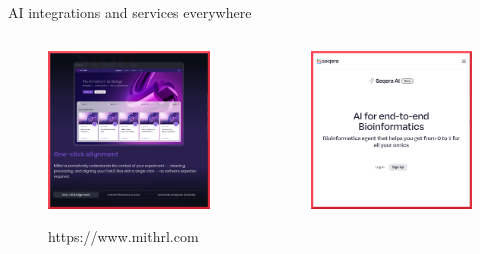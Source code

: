 \documentclass[10pt]{beamer}
\newcommand{\creditdark}[1]{{\par \raggedleft \scriptsize \mdseries \color{scMGray} #1 \par}}
\begin{document}
\begin{frame}{AI integrations and services everywhere}
\begin{columns}[T,onlytextwidth]
\begin{figure}
			\includegraphics[width=\textwidth]{figures/GenerativeAI_DNA_Analysis_Mithrl.png}
			\creditdark{https://www.mithrl.com}
		\end{figure}
		\begin{figure}
			\includegraphics[width=\textwidth]{figures/GenerativeAI_DNA_Analysis_Seqera.png}

\end{figure}
\end{columns}
\end{frame}
\end{document}
